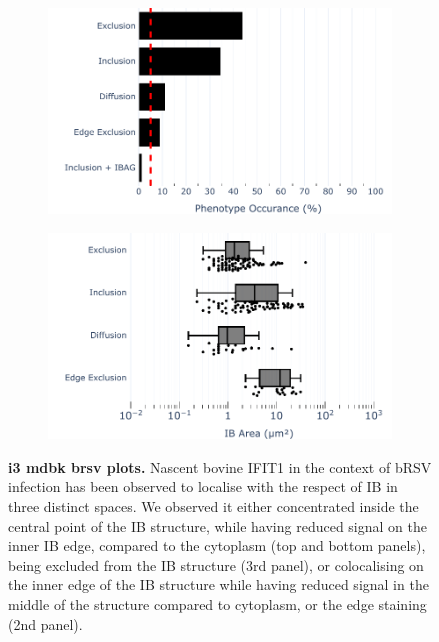 \begin{figure}
    \begin{subfigure}{0.495\textwidth}
        \caption{}
        \includegraphics[width=1\linewidth]{09. Chapter 4/Figs/02. Infection/02. IFIT3/07. bar_i3_mdbk.pdf} 
    \end{subfigure}
    \begin{subfigure}{0.495\textwidth}
        \caption{}
        \includegraphics[width=1\linewidth]{09. Chapter 4/Figs/02. Infection/02. IFIT3/08. box_i3_mdbk.pdf}
    \end{subfigure}
    \caption[i3 mdbk brsv plots]{\textbf{i3 mdbk brsv plots.} Nascent bovine IFIT1 in the context of bRSV infection has been observed to localise with the respect of IB in three distinct spaces. We observed it either concentrated inside the central point of the IB structure, while having reduced signal on the inner IB edge, compared to the cytoplasm (top and bottom panels), being excluded from the IB structure (3rd panel), or colocalising on the inner edge of the IB structure while having reduced signal in the middle of the structure compared to cytoplasm, or the edge staining (2nd panel).}
    \label{fig:i3 mdbk brsv plots}
\end{figure}


